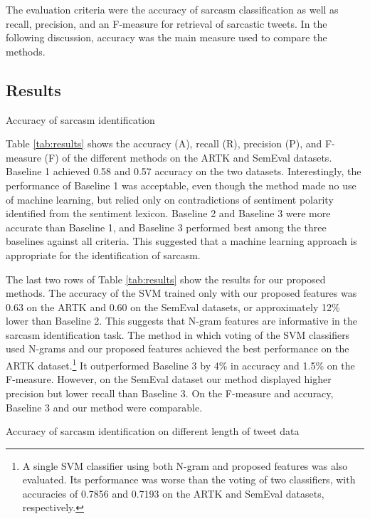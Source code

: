 \documentclass[english]{jnlp_1.4}
\begin{document}
The evaluation criteria were the accuracy of sarcasm classification as well as recall, precision, and an F-measure for retrieval of sarcastic tweets. In the following discussion, accuracy was the main measure used to compare the methods.


\subsection{Results}

\begin{table}[b]
\caption{Accuracy of sarcasm identification}

\end{table}

Table \ref{tab:results} shows the accuracy (A), recall (R), precision (P), and F-measure (F) of the different methods on the ARTK and SemEval datasets.
Baseline 1 achieved 0.58 and 0.57 accuracy on the two datasets.
Interestingly, the performance of Baseline 1 was acceptable, even though the method made no use of machine learning, but relied only on contradictions of sentiment polarity identified from the sentiment lexicon.
Baseline 2 and Baseline 3 were more accurate than Baseline 1, and Baseline 3 performed best among the three baselines against all criteria.
This suggested that a machine learning approach is appropriate for the identification of sarcasm.

The last two rows of Table \ref{tab:results} show the results for our proposed methods.
The accuracy of the SVM trained only with our proposed features was 0.63 on the ARTK and 0.60 on the SemEval datasets, or approximately 12\% lower than Baseline 2.
This suggests that N-gram features are informative in the sarcasm identification task.
The method in which voting of the SVM classifiers used N-grams and our proposed features achieved the best performance on the ARTK dataset.\footnote{A single SVM classifier using both N-gram and proposed features was also evaluated. Its performance was worse than the voting of two classifiers, with accuracies of 0.7856 and 0.7193 on the ARTK and SemEval datasets, respectively.}\@ 
It outperformed Baseline 3 by 4\% in accuracy and 1.5\% on the F-measure.
However, on the SemEval dataset our method displayed higher precision but lower recall than Baseline 3.
On the F-measure and accuracy, Baseline 3 and our method were comparable.

\begin{table}[b]
\label{tab:sentence_length_comparison}

\end{table}
\begin{table}[b]
\caption{Accuracy of sarcasm identification on different length of tweet data}
\label{tab:accuracy_different_sentence_length}

\end{table}
\end{document}
